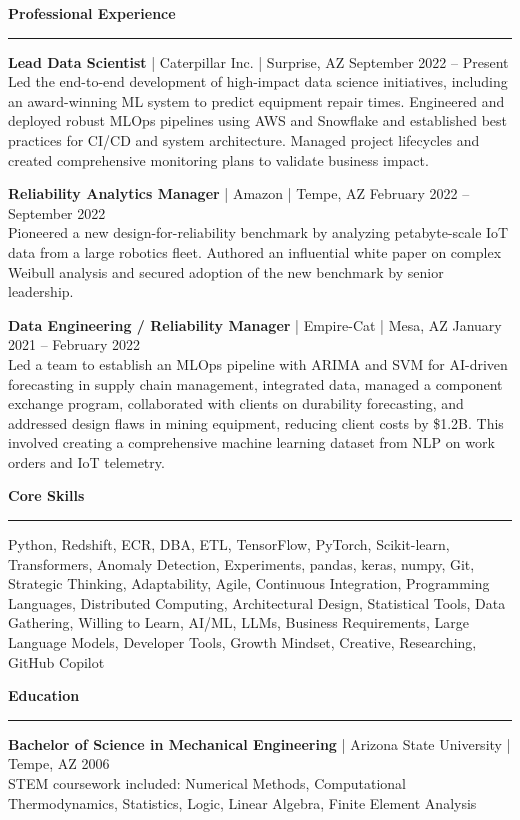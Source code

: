 \documentclass[11pt, letterpaper, sans]{article}
\newcommand{\sectionheader}[1]{%
  \vspace{11pt}%
  \par\noindent\textbf{\Large #1}\par\hrule\vspace{5pt}%
}
\begin{document}
\sectionheader{Professional Experience}

\textbf{Lead Data Scientist} | Caterpillar Inc. | Surprise, AZ \hfill September 2022 – Present \\
Led the end-to-end development of high-impact data science initiatives, including an award-winning ML system to predict equipment repair times. Engineered and deployed robust MLOps pipelines using AWS and Snowflake and established best practices for CI/CD and system architecture. Managed project lifecycles and created comprehensive monitoring plans to validate business impact.

\vspace{0.2cm}

\textbf{Reliability Analytics Manager} | Amazon | Tempe, AZ \hfill February 2022 – September 2022 \\
Pioneered a new design-for-reliability benchmark by analyzing petabyte-scale IoT data from a large robotics fleet. Authored an influential white paper on complex Weibull analysis and secured adoption of the new benchmark by senior leadership.

\vspace{0.2cm}

\textbf{Data Engineering / Reliability Manager} | Empire-Cat | Mesa, AZ \hfill January 2021 – February 2022 \\ 
Led a team to establish an MLOps pipeline with ARIMA and SVM for AI-driven forecasting in supply chain management, integrated data, managed a component exchange program, collaborated with clients on durability forecasting, and addressed design flaws in mining equipment, reducing client costs by \$1.2B. This involved creating a comprehensive machine learning dataset from NLP on work orders and IoT telemetry.

\sectionheader{Core Skills}

Python, Redshift, ECR, DBA, ETL, TensorFlow, PyTorch, Scikit-learn, Transformers, Anomaly Detection, Experiments, pandas, keras, numpy, Git, Strategic Thinking, Adaptability, Agile, Continuous Integration, Programming Languages, Distributed Computing, Architectural Design, Statistical Tools, Data Gathering, Willing to Learn, AI/ML, LLMs, Business Requirements, Large Language Models, Developer Tools, Growth Mindset, Creative, Researching, GitHub Copilot

\sectionheader{Education}

\textbf{Bachelor of Science in Mechanical Engineering} | Arizona State University | Tempe, AZ 
\hfill 2006 \\
STEM coursework included: Numerical Methods, Computational Thermodynamics, Statistics, Logic, Linear Algebra, Finite Element Analysis
\end{document}
